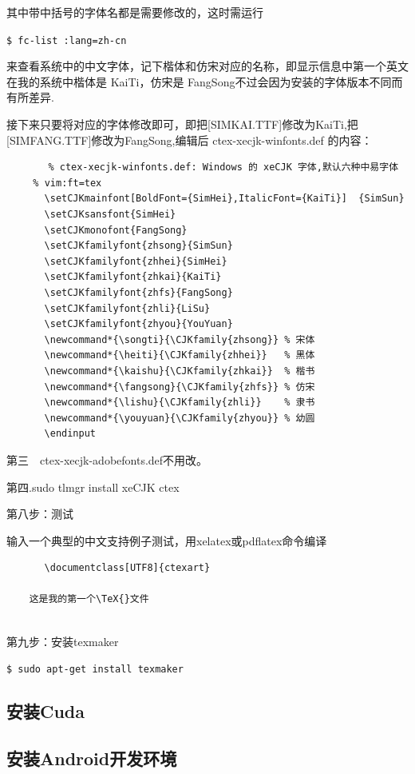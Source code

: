 其中带中括号的字体名都是需要修改的，这时需运行

\verb"$ fc-list :lang=zh-cn"

来查看系统中的中文字体，记下楷体和仿宋对应的名称，即显示信息中第一个英文在我的系统中楷体是 KaiTi，仿宋是 FangSong不过会因为安装的字体版本不同而有所差异.

接下来只要将对应的字体修改即可，即把[SIMKAI.TTF]修改为KaiTi,把[SIMFANG.TTF]修改为FangSong,编辑后 ctex-xecjk-winfonts.def 的内容：
\begin{verbatim}
    　　% ctex-xecjk-winfonts.def: Windows 的 xeCJK 字体,默认六种中易字体
　	% vim:ft=tex
　　　　\setCJKmainfont[BoldFont={SimHei},ItalicFont={KaiTi}]  {SimSun}
　　　　\setCJKsansfont{SimHei}
　　　　\setCJKmonofont{FangSong}
　　　　\setCJKfamilyfont{zhsong}{SimSun}
　　　　\setCJKfamilyfont{zhhei}{SimHei}
　　　　\setCJKfamilyfont{zhkai}{KaiTi}
　　　　\setCJKfamilyfont{zhfs}{FangSong}
　　　　\setCJKfamilyfont{zhli}{LiSu}
　　　　\setCJKfamilyfont{zhyou}{YouYuan}
　　　　\newcommand*{\songti}{\CJKfamily{zhsong}} % 宋体
　　　　\newcommand*{\heiti}{\CJKfamily{zhhei}}   % 黑体
　　　　\newcommand*{\kaishu}{\CJKfamily{zhkai}}  % 楷书
　　　　\newcommand*{\fangsong}{\CJKfamily{zhfs}} % 仿宋
　　　　\newcommand*{\lishu}{\CJKfamily{zhli}}    % 隶书
　　　　\newcommand*{\youyuan}{\CJKfamily{zhyou}} % 幼圆
　　　　\endinput
\end{verbatim}

第三　ctex-xecjk-adobefonts.def不用改。

第四.sudo   tlmgr   install   xeCJK   ctex

第八步：测试

输入一个典型的中文支持例子测试，用xelatex或pdflatex命令编译
\begin{verbatim}
　　　　\documentclass[UTF8]{ctexart}　　　　
	　　　　
	这是我的第一个\TeX{}文件　　　　
	
\end{verbatim}

第九步：安装texmaker

\verb"$ sudo apt-get install texmaker"

\subsection{安装Cuda}

\subsection{安装Android开发环境}

